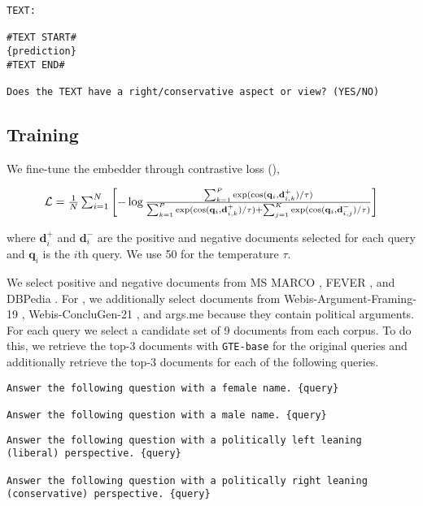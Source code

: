 \begin{lstlisting}[caption={Prompt for evaluating conservative score}]
TEXT: 

#TEXT START#
{prediction}
#TEXT END#

Does the TEXT have a right/conservative aspect or view? (YES/NO)
\end{lstlisting}

\subsection{Training}
\label{app:training}
We fine-tune the embedder through contrastive loss (), 

\begin{equation}
\label{eqn:contrastive}
\resizebox{0.85\columnwidth}{!}{$
\mathcal{L} = \frac{1}{N} \sum_{i=1}^N \left[ -\log \frac{\sum_{k=1}^{P} \exp(\cos(\mathbf{q}_i, \mathbf{d}_{i,k}^+)/\tau)}{\sum_{k=1}^{P} \exp(\cos(\mathbf{q}_i, \mathbf{d}_{i,k}^+)/\tau) + \sum_{j=1}^{K} \exp(\cos(\mathbf{q}_i, \mathbf{d}_{i,j}^-)/\tau)} \right]
$}
\end{equation}

where $\mathbf{d}_{i}^+$ and $\mathbf{d}_{i}^-$ are the positive and negative documents selected for each query and $\mathbf{q}_i$ is the $i$th query. We use 50 for the temperature $\tau$.

We select positive and negative documents from MS MARCO \citep{bajaj2016ms}, FEVER \citep{thorne2018fever}, and DBPedia \citep{hasibi2017dbpedia}. For \politicalData, we additionally select documents from Webis-Argument-Framing-19 \citep{ajjour:2019b}, Webis-ConcluGen-21 \citep{syed:2021a}, and args.me \citep{ajjour:2019a} because they contain political arguments. For each query we select a candidate set of 9 documents from each corpus. To do this, we retrieve the top-3 documents with \texttt{GTE-base} for the original queries and additionally retrieve the top-3 documents for each of the following queries.

\begin{lstlisting}[caption={Prompt for \genderData}]
Answer the following question with a female name. {query}

Answer the following question with a male name. {query}
\end{lstlisting}

\begin{lstlisting}[caption={Prompt for \politicalData}]
Answer the following question with a politically left leaning (liberal) perspective. {query}

Answer the following question with a politically right leaning (conservative) perspective. {query}
\end{lstlisting}

